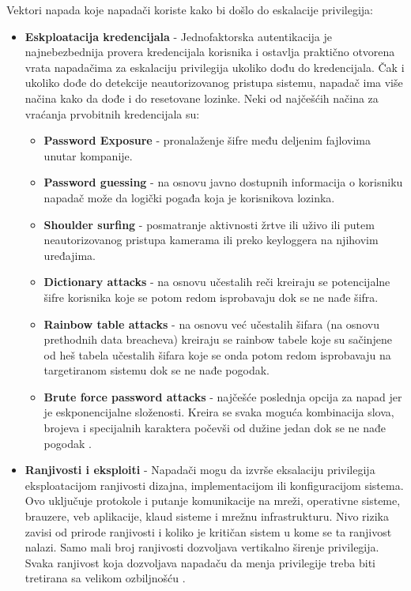 \documentclass[a4paper,12pt]{article}
\begin{document}
Vektori napada koje napadači koriste kako bi došlo do eskalacije privilegija:

\begin{itemize}
  \item \textbf{Eskploatacija kredencijala} - Jednofaktorska autentikacija\cite{1fa} je najnebezbednija provera kredencijala korisnika i ostavlja praktično otvorena vrata napadačima za eskalaciju privilegija ukoliko dođu do kredencijala. Čak i ukoliko dođe do detekcije neautorizovanog pristupa sistemu, napadač ima više načina kako da dođe i do resetovane lozinke. Neki od najčešćih načina za vraćanja prvobitnih kredencijala su:
  \begin{itemize}
    \item \textbf{Password Exposure} - pronalaženje šifre među deljenim fajlovima unutar kompanije.
    \item \textbf{Password guessing} - na osnovu javno dostupnih informacija o korisniku napadač može da logički pogađa koja je korisnikova lozinka.
    \item \textbf{Shoulder surfing} - posmatranje aktivnosti žrtve ili uživo ili putem neautorizovanog pristupa kamerama ili preko keyloggera na njihovim uređajima. 
    \item \textbf{Dictionary attacks} - na osnovu učestalih reči kreiraju se potencijalne šifre korisnika koje se potom redom isprobavaju dok se ne nađe šifra. 
    \item \textbf{Rainbow table attacks} - na osnovu već učestalih šifara (na osnovu prethodnih data breacheva) kreiraju se rainbow tabele koje su sačinjene od heš tabela učestalih šifara koje se onda potom redom isprobavaju na targetiranom sistemu dok se ne nađe pogodak. 
    \item \textbf{Brute force password attacks} - najčešće poslednja opcija za napad jer je eskponencijalne složenosti. Kreira se svaka moguća kombinacija slova, brojeva i specijalnih karaktera počevši od dužine jedan dok se ne nađe pogodak \cite{privilege-escalation-2}. 
  \end{itemize}
  \item \textbf{Ranjivosti i eksploiti} - Napadači mogu da izvrše eksalaciju privilegija eksploatacijom ranjivosti dizajna, implementacijom ili konfiguracijom sistema. Ovo uključuje protokole i putanje komunikacije na mreži, operativne sisteme, brauzere, veb aplikacije, klaud sisteme i mrežnu infrastrukturu. Nivo rizika zavisi od prirode ranjivosti i koliko je kritičan sistem u kome se ta ranjivost nalazi. Samo mali broj ranjivosti dozvoljava vertikalno širenje privilegija. Svaka ranjivost koja dozvoljava napadaču da menja privilegije treba biti tretirana sa velikom ozbiljnošću \cite{privilege-escalation-2}. 

\end{itemize}
\end{document}
